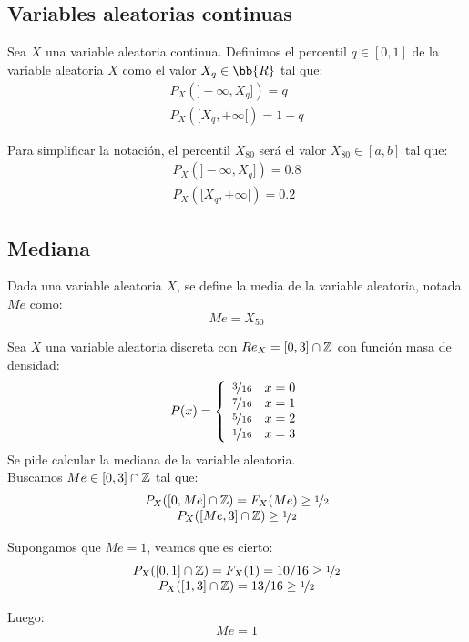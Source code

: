 \subsection{Variables aleatorias continuas}
\begin{definicion}
    Sea $X$ una variable aleatoria continua. Definimos el percentil $q \in [0,1]$ de la variable
    aleatoria $X$ como el valor $X_q \in \bb{R}$ tal que:
    $$\begin{array}{c}
        P_X(]-\infty, X_q]) = q \\
        P_X([X_q, +\infty[) = 1-q
    \end{array}$$
\end{definicion}
\begin{notacion}
    Para simplificar la notación, el percentil $X_{80}$ será el valor $X_{80} \in [a,b]$ tal que:
    $$\begin{array}{c}
        P_X(]-\infty, X_q]) = 0.8 \\
        P_X([X_q, +\infty[) = 0.2
    \end{array}$$
\end{notacion}

\subsection{Mediana}
\begin{definicion}
    Dada una variable aleatoria $X$, se define la media de la variable aleatoria, notada $Me$ como:
    $$Me = X_{50}$$
\end{definicion}

\begin{ejemplo}
    Sea $X$ una variable aleatoria discreta con $Re_X = [0,3] \cap \mathbb Z$ con función masa de densidad:
    $$P(x) = \left\{ \begin{array}{cc}
        \nicefrac{3}{16} & x = 0 \\
        \nicefrac{7}{16} & x = 1 \\
        \nicefrac{5}{16} & x = 2 \\
        \nicefrac{1}{16} & x = 3
      \end{array} \right.$$
    Se pide calcular la mediana de la variable aleatoria.\\
    
    
    Buscamos $Me \in [0,3] \cap \mathbb Z$ tal que:
    $$\begin{array}{c}
        P_X([0, Me] \cap \mathbb Z) = F_X(Me) \geq \nicefrac{1}{2} \\
        P_X([Me, 3] \cap \mathbb Z) \geq \nicefrac{1}{2}
      \end{array}$$
    
    
    Supongamos que $Me=1$, veamos que es cierto:
    $$\begin{array}{c}
        P_X([0, 1] \cap \mathbb Z) = F_X(1) = 10/16 \geq \nicefrac{1}{2} \\
        P_X([1, 3] \cap \mathbb Z) = 13/16 \geq \nicefrac{1}{2}
      \end{array}$$
    
    Luego:
    $$Me = 1$$
\end{ejemplo}


